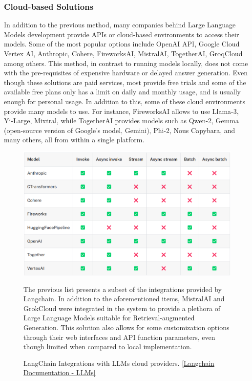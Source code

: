 \subsubsection{Cloud-based Solutions}
In addition to the previous method, many companies behind Large Language Models development provide APIs or cloud-based environments to access their models. Some of the most popular options include OpenAI API, Google Cloud Vertex AI, Anthropic, Cohere, FireworksAI, MistralAI, TogetherAI, GroqCloud among others.\newline
This method, in contrast to running models locally, does not come with the pre-requisites of expensive hardware or delayed answer generation. Even though these solutions are paid services, most provide free trials and some of the available free plans only has a limit on daily and monthly usage, and is usually enough for personal usage. In addition to this, some of these cloud environments provide many models to use. For instance, FireworksAI allows to use Llama-3, Yi-Large, Mixtral, while TogetherAI provides models such as Qwen-2, Gemma (open-source version of Google's model, Gemini), Phi-2, Nous Capybara, and many others, all from within a single platform.
\begin{figure}[H]
    \centering
    \includegraphics[width=\linewidth]{./figures/langchain-llm-integrations.png}
    \caption{LangChain Integrations with LLMs cloud providers. \href{https://python.langchain.com/v0.1/docs/integrations/llms/}{[Langchain Documentation - LLMs]}}
    \begin{flushleft}
        \small The previous list presents a subset of the integrations provided by Langchain. In addition to the aforementioned items, MistralAI and GrokCloud were integrated in the system to provide a plethora of Large Language Models suitable for Retrieval-augmented Generation. This solution also allows for some customization options through their web interfaces and API function parameters, even though limited when compared to local implementation.
    \end{flushleft}
\end{figure}
